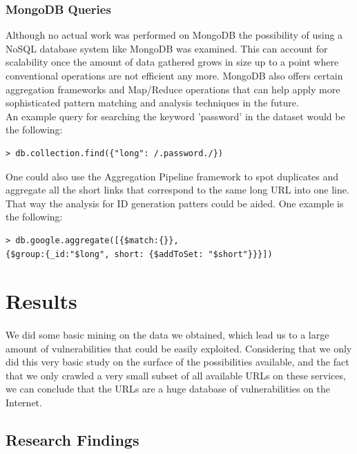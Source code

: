 \documentclass[12pt]{article}
\begin{document}
\subsubsection{MongoDB Queries}
Although no actual work was performed on MongoDB the possibility of using a NoSQL database system like MongoDB was examined. This can account for scalability once the amount of data gathered grows in size up to a point where conventional operations are not efficient any more. MongoDB also offers certain aggregation frameworks and Map/Reduce operations that can help apply more sophisticated pattern matching and analysis techniques in the future.\\
An example query for searching the keyword 'password' in the dataset would be the following:

\begin{lstlisting}
> db.collection.find({"long": /.password./})
\end{lstlisting}

\noindent One could also use the Aggregation Pipeline framework to spot duplicates and aggregate all the short links that correspond to the same long URL into one line. That way the analysis for ID generation patters could be aided. One example is the following:


\begin{lstlisting}
> db.google.aggregate([{$match:{}}, 
{$group:{_id:"$long", short: {$addToSet: "$short"}}}])
\end{lstlisting}


\newpage
\section{Results}

\paragraph{}
We did some basic mining on the data we obtained, which lead us to a large amount of vulnerabilities that could be easily exploited. Considering that we only did this very basic study on the surface of the possibilities available, and the fact that we only crawled a very small subset of all available URLs on these services, we can conclude that the URLs are a huge database of vulnerabilities on the Internet.

\subsection{Research Findings}
\end{document}

